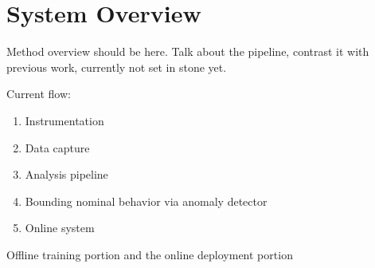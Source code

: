 \section{System Overview} \label{overview}

Method overview should be here. Talk about the pipeline, contrast it
with previous work, currently not set in stone yet.

Current flow:

\begin{enumerate}
  \item Instrumentation 
  \item Data capture
  \item Analysis pipeline
  \item Bounding nominal behavior via anomaly detector
  \item Online system
\end{enumerate}

Offline training portion and the online deployment portion
